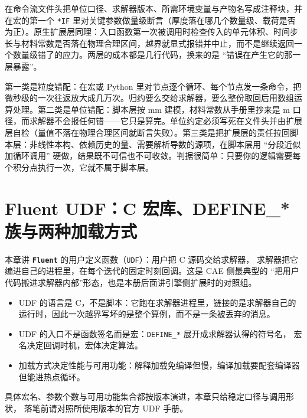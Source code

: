 \documentclass[12pt,a4paper,fontset=fandol]{ctexbook}
\newcommand{\Tp}[1]{\texttt{#1}}
\newcommand{\Lib}[1]{\textbf{\texttt{#1}}}
\newcommand{\Lang}[1]{\textsf{#1}}
\newcommand{\CL}{\Lang{C}}
\newcommand{\PY}{\Lang{Python}}
\newcommand{\DomCAE}{\Lang{CAE}}
\begin{document}
\begin{bestpractice}[title={宏与扩展层之间留一份 ``自检契约''}]
在命令流文件头把单位口径、求解器版本、所需环境变量与产物名写成注释块，并在宏的第一个 \Tp{*IF} 里对关键参数做量级断言（厚度落在哪几个数量级、载荷是否为正）。原生扩展层同理：入口函数第一次被调用时检查传入的单元体积、时间步长与材料常数是否落在物理合理区间，越界就显式报错并中止，而不是继续返回一个数量级错了的应力。两层的成本都是几行代码，换来的是 ``错误在产生它的那一层暴露''。
\end{bestpractice}

\begin{warning}[title={把脚本层当求解器层用：最常见的三类翻车}]
第一类是粒度错配：在宏或 \PY{} 里对节点逐个循环、每个节点发一条命令，把微秒级的一次往返放大成几万次。归约要么交给求解器，要么整份取回后用数组运算处理。第二类是单位错配：脚本层按 mm 建模，材料常数从手册里抄来是 m 口径，而求解器不会报任何错——它只是算完。单位约定必须写死在文件头并由扩展层自检（量值不落在物理合理区间就断言失败）。第三类是把扩展层的责任拉回脚本层：非线性本构、依赖历史的量、需要解析导数的源项，在脚本层用 ``分段近似加循环调用'' 硬做，结果既不可信也不可收敛。判据很简单：只要你的逻辑需要每个积分点执行一次，它就不属于脚本层。
\end{warning}

\chapter{Fluent UDF：C 宏库、DEFINE\_* 族与两种加载方式}
\label{ch:ch03-fluent-udf}

本章讲 \Lib{Fluent} 的用户定义函数（\Tp{UDF}）：用户把 \CL{} 源码交给求解器，
求解器把它编进自己的进程里，在每个迭代的固定时刻回调。这是 \DomCAE{} 侧最典型的
``把用户代码搬进求解器内部''形态，也是本册后面讲引擎侧扩展时的对照组。

\begin{guideline}[title={读本章前先记住三件事}]
\begin{itemize}
  \item UDF 的语言是 \CL{}，不是脚本：它跑在求解器进程里，链接的是求解器自己的
        运行时，因此一次越界写坏的是整个算例，而不是一条被丢弃的消息。
  \item UDF 的入口不是函数签名而是宏：\Tp{DEFINE\_*} 展开成求解器认得的符号名，
        宏名决定回调时机，宏体决定算法。
  \item 加载方式决定性能与可用功能：解释加载免编译但慢，编译加载要配套编译器
        但能进热点循环。
\end{itemize}
具体宏名、参数个数与可用功能集合都按版本演进，本章只给稳定口径与调用形状，
落笔前请对照所使用版本的官方 UDF 手册。
\end{guideline}
\end{document}
